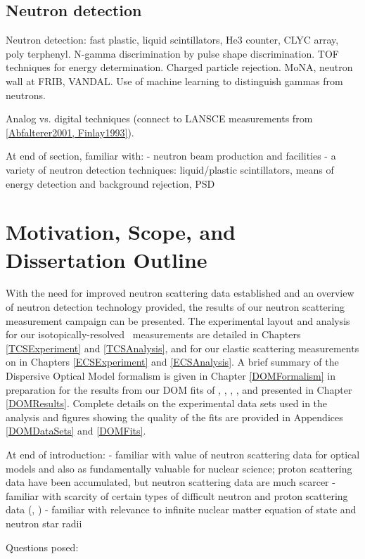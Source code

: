 \begin{eqation}
\subsection{Neutron detection}
Neutron detection: fast plastic, liquid scintillators, He3 counter, CLYC array, poly
terphenyl. N-gamma discrimination by pulse shape discrimination. TOF techniques
for energy determination. Charged particle rejection. MoNA, neutron wall at
FRIB, VANDAL. Use of machine learning to distinguish gammas from neutrons.

Analog vs. digital techniques (connect to LANSCE measurements from \ref{Abfalterer2001, Finlay1993}).

At end of section, familiar with:
- neutron beam production and facilities
- a variety of neutron detection techniques: liquid/plastic scintillators,
means of energy detection and background rejection, PSD

\section{Motivation, Scope, and Dissertation Outline}
With the need for improved neutron scattering data established and an overview of neutron
detection technology provided, the results of our neutron scattering measurement campaign can be
presented. The experimental layout and analysis for our isotopically-resolved \tot\ measurements are 
detailed
in Chapters \ref{TCSExperiment} and \ref{TCSAnalysis}, and for our elastic scattering measurements 
on \snTwelveFour in Chapters \ref{ECSExperiment} and \ref{ECSAnalysis}. A brief summary of the 
Dispersive Optical Model formalism is
given in Chapter \ref{DOMFormalism} in preparation for the results from our DOM fits of \oSixEight, \caAughtEight, 
\niEightFour, \snTwelveFour, and \pbEight presented in Chapter \ref{DOMResults}. Complete
details on the experimental data sets used in the analysis and figures showing the quality of the
fits are provided in Appendices \ref{DOMDataSets} and \ref{DOMFits}. 

At end of introduction:
- familiar with value of neutron scattering data for optical models and also as
fundamentally valuable for nuclear science; proton scattering data have been
accumulated, but neutron scattering data are much scarcer
- familiar with scarcity of certain types of difficult neutron and proton
scattering data (\tot, \rxnE)
- familiar with relevance to infinite nuclear matter equation of state and
neutron star radii

Questions posed:


\end{eqation}
